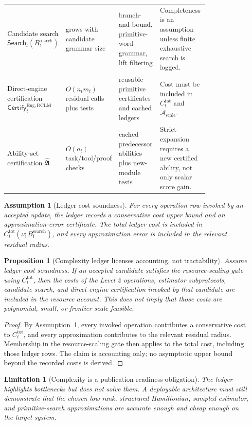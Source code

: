 \documentclass[11pt,a4paper]{article}
\newtheorem{proposition}[theorem]{Proposition}
\newtheorem{assumption}[theorem]{Assumption}
\newtheorem{limitation}[theorem]{Limitation}
\newcommand{\Acal}{\mathcal A}
\newcommand{\RCLM}{\mathrm{RCLM}}
\newcommand{\search}{\mathrm{search}}
\newcommand{\scale}{\mathrm{scale}}
\newcommand{\tot}{\mathrm{tot}}
\newcommand{\Eng}{\mathrm{Eng}}
\begin{document}
\begin{longtable}{>{\raggedright\arraybackslash}p{0.19\linewidth}>{\raggedright\arraybackslash}p{0.17\linewidth}>{\raggedright\arraybackslash}p{0.21\linewidth}>{\raggedright\arraybackslash}p{0.25\linewidth}}
Candidate search \(\mathsf{Search}_t(B_t^{\search})\) & grows with candidate grammar size & branch-and-bound, primitive-word grammar, lift filtering & Completeness is an assumption unless finite exhaustive search is logged.\\
Direct-engine certification \(\mathsf{Certify}_t^{\Eng,\RCLM}\) & \(O(n_t m_t)\) residual calls plus tests & reusable primitive certificates and cached ledgers & Cost must be included in \(C_t^{\tot}\) and \(\Acal_{\scale}\).\\
Ability-set certification \(\widehat{\mathfrak A}\) & \(O(a_t)\) task/tool/proof checks & cached predecessor abilities plus new-module tests & Strict expansion requires a new certified ability, not only scalar score gain.\\
\end{longtable}
\endgroup

\begin{assumption}[Ledger cost soundness]
\label{ass:ledger-cost-soundness}
For every operation row invoked by an accepted update, the ledger records a conservative cost upper bound and an approximation-error certificate.  The total ledger cost is included in \(C_t^{\tot}(\nu;B_t^{\search})\), and every approximation error is included in the relevant residual radius.
\end{assumption}

\begin{proposition}[Complexity ledger licenses accounting, not tractability]
\label{prop:complexity-ledger-accounting}
Assume ledger cost soundness.  If an accepted candidate satisfies the resource-scaling gate using \(C_t^{\tot}\), then the costs of the Level 2 operations, estimator subprotocols, candidate search, and direct-engine certification invoked by that candidate are included in the resource account.  This does not imply that those costs are polynomial, small, or frontier-scale feasible.
\end{proposition}

\begin{proof}
By Assumption~\ref{ass:ledger-cost-soundness}, every invoked operation contributes a conservative cost to \(C_t^{\tot}\), and every approximation contributes to the relevant residual radius.  Membership in the resource-scaling gate then applies to the total cost, including those ledger rows.  The claim is accounting only; no asymptotic upper bound beyond the recorded costs is derived.
\end{proof}

\begin{limitation}[Complexity is a publication-readiness obligation]
The ledger highlights bottlenecks but does not solve them.  A deployable architecture must still demonstrate that the chosen low-rank, structured-Hamiltonian, sampled-estimator, and primitive-search approximations are accurate enough and cheap enough on the target system.
\end{limitation}
\end{document}
